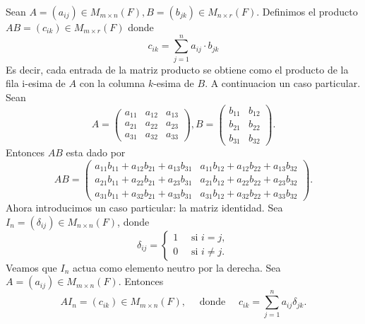 \documentclass[12pt,a4paper]{book}
\begin{document}
    Sean $A=(a_{ij})\in M_{m\times n}(F),B=(b_{jk})\in M_{n\times r}(F)$. Definimos el
    producto $AB=(c_{ik})\in M_{m\times r}(F)$ donde
    \begin{equation*}
        c_{ik}=\sum_{j=1}^{n}a_{ij}\cdot b_{jk}
    \end{equation*}
    Es decir, cada entrada de la matriz producto se obtiene como el producto de la fila i-esima
    de $A$ con la columna $k$-esima de $B$. A continuacion un caso particular. Sean
    \begin{equation*}
        A=
        \begin{pmatrix}
            a_{11} & a_{12} & a_{13}\\
            a_{21} & a_{22} & a_{23}\\
            a_{31} & a_{32} & a_{33}
        \end{pmatrix},
        B=
        \begin{pmatrix}
            b_{11} & b_{12}\\
            b_{21} & b_{22}\\
            b_{31} & b_{32}
        \end{pmatrix}.
    \end{equation*}
    Entonces $AB$ esta dado por
    \begin{equation*}
        AB=
        \begin{pmatrix}
            a_{11}b_{11}+a_{12}b_{21}+a_{13}b_{31} & a_{11}b_{12}+a_{12}b_{22}+a_{13}b_{32}\\
            a_{21}b_{11}+a_{22}b_{21}+a_{23}b_{31} & a_{21}b_{12}+a_{22}b_{22}+a_{23}b_{32}\\
            a_{31}b_{11}+a_{32}b_{21}+a_{33}b_{31} & a_{31}b_{12}+a_{32}b_{22}+a_{33}b_{32}
        \end{pmatrix}.
    \end{equation*}
    Ahora introducimos un caso particular: la matriz identidad. Sea $I_{n}=(\delta_{ij})\in M_{n\times n}(F)$, donde
    \begin{equation*}
        \delta_{ij}=
        \begin{cases}
            1\quad\text{ si }i=j,\\
            0\quad\text{ si }i\neq j.
        \end{cases}
    \end{equation*}
    Veamos que $I_{n}$ actua como elemento neutro por la derecha. Sea $A=(a_{ij})\in M_{m\times n}(F)$.
    Entonces
    \begin{equation*}
        AI_{n}=(c_{ik})\in M_{m\times n}(F),\quad\text{ donde }\quad c_{ik}=\sum_{j=1}^{n}a_{ij}\delta_{jk}.
    \end{equation*}
\end{document}

